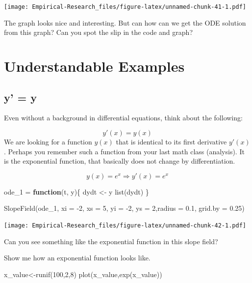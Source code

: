 \documentclass[
]{book}
\newenvironment{Shaded}{\begin{snugshade}}{\end{snugshade}}
\newcommand{\AttributeTok}[1]{\textcolor[rgb]{0.77,0.63,0.00}{#1}}
\newcommand{\ControlFlowTok}[1]{\textcolor[rgb]{0.13,0.29,0.53}{\textbf{#1}}}
\newcommand{\DecValTok}[1]{\textcolor[rgb]{0.00,0.00,0.81}{#1}}
\newcommand{\FloatTok}[1]{\textcolor[rgb]{0.00,0.00,0.81}{#1}}
\newcommand{\FunctionTok}[1]{\textcolor[rgb]{0.00,0.00,0.00}{#1}}
\newcommand{\NormalTok}[1]{#1}
\newcommand{\OtherTok}[1]{\textcolor[rgb]{0.56,0.35,0.01}{#1}}
\newcommand{\SpecialCharTok}[1]{\textcolor[rgb]{0.00,0.00,0.00}{#1}}
\begin{document}
\texttt{[image: Empirical-Research\_files/figure-latex/unnamed-chunk-41-1.pdf]}

The graph looks nice and interesting. But can how can we get the ODE solution from this graph? Can you spot the slip in the code and graph?

\hypertarget{understandable-examples}{%
\section{Understandable Examples}\label{understandable-examples}}

\hypertarget{y-y}{%
\subsection{y' = y}\label{y-y}}

Even without a background in differential equations, think about the following:

\[y'(x) = y(x)\]
We are looking for a function \(y(x)\) that is identical to its first derivative \(y'(x)\). Perhaps you remember such a function from your last math class (analysis). It is the exponential function, that basically does not change by differentiation.

\[y(x) = e^x \Rightarrow y'(x) = e^x \]

\begin{Shaded}
\begin{Highlighting}[]
\NormalTok{ode\_1 }\OtherTok{=} \ControlFlowTok{function}\NormalTok{(t, y)\{}
\NormalTok{  dydt }\OtherTok{\textless{}{-}}\NormalTok{ y}
  \FunctionTok{list}\NormalTok{(dydt)}
\NormalTok{\}}

\FunctionTok{SlopeField}\NormalTok{(ode\_1, }\AttributeTok{xi =} \SpecialCharTok{{-}}\DecValTok{2}\NormalTok{, }\AttributeTok{xs =} \DecValTok{5}\NormalTok{, }\AttributeTok{yi =} \SpecialCharTok{{-}}\DecValTok{2}\NormalTok{, }\AttributeTok{ys =} \DecValTok{2}\NormalTok{,}\AttributeTok{radius =} \FloatTok{0.1}\NormalTok{, }\AttributeTok{grid.by =} \FloatTok{0.25}\NormalTok{)}
\end{Highlighting}
\end{Shaded}

\texttt{[image: Empirical-Research\_files/figure-latex/unnamed-chunk-42-1.pdf]}

Can you see something like the exponential function in this slope field?

Show me how an exponential function looks like.

\begin{Shaded}
\begin{Highlighting}[]
\NormalTok{x\_value}\OtherTok{\textless{}{-}}\FunctionTok{runif}\NormalTok{(}\DecValTok{100}\NormalTok{,}\DecValTok{2}\NormalTok{,}\DecValTok{8}\NormalTok{)}
\FunctionTok{plot}\NormalTok{(x\_value,}\FunctionTok{exp}\NormalTok{(x\_value))}
\end{Highlighting}
\end{Shaded}
\end{document}
